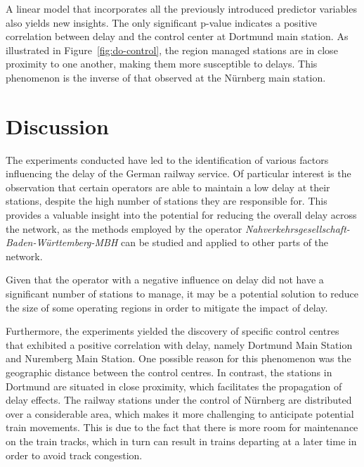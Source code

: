 \documentclass[12pt,a4paper]{article}
\begin{document}
A linear model that incorporates all the previously introduced predictor variables also yields new insights. 
The only significant p-value indicates a positive correlation between delay and the control center at Dortmund main station. 
As illustrated in Figure~\ref{fig:do-control}, the region managed stations are in close proximity to one another, making them more susceptible to delays. 
This phenomenon is the inverse of that observed at the Nürnberg main station.

\maketitle
\section{\label{sec:Discussion}Discussion}

The experiments conducted have led to the identification of various factors influencing the delay of the German railway service. 
Of particular interest is the observation that certain operators are able to maintain a low delay at their stations, despite the high number of stations they are responsible for. 
This provides a valuable insight into the potential for reducing the overall delay across the network, as the methods employed by the operator \textit{Nahverkehrsgesellschaft-Baden-Württemberg-MBH} can be studied and applied to other parts of the network. 

Given that the operator with a negative influence on delay did not have a significant number of stations to manage, it may be a potential solution to reduce the size of some operating regions in order to mitigate the impact of delay. 

Furthermore, the experiments yielded the discovery of specific control centres that exhibited a positive correlation with delay, namely Dortmund Main Station and Nuremberg Main Station. 
One possible reason for this phenomenon was the geographic distance between the control centres. In contrast, the stations in Dortmund are situated in close proximity, which facilitates the propagation of delay effects. 
The railway stations under the control of Nürnberg are distributed over a considerable area, which makes it more challenging to anticipate potential train movements. 
This is due to the fact that there is more room for maintenance on the train tracks, which in turn can result in trains departing at a later time in order to avoid track congestion. 
\end{document}
